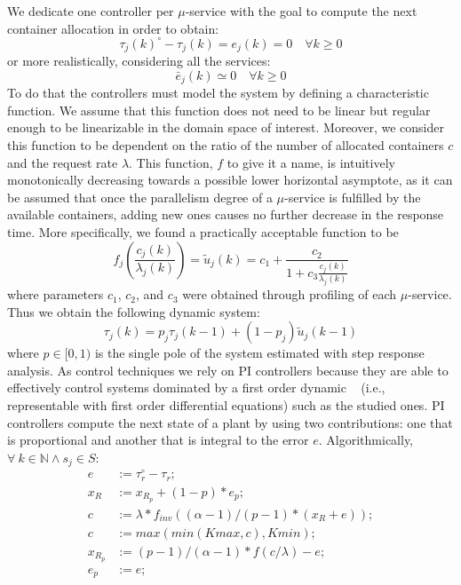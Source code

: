 We dedicate one controller per $\mu$-service with the goal to compute the next container allocation in order to obtain:
{\scriptsize
\begin{equation}
\tau_j(k)^\circ - \tau_j(k) = e_j(k) = 0\quad \forall{k} \ge 0
\end{equation}
}%
or more realistically, considering all the services:
{\scriptsize
\begin{equation}
\bar{e}_j(k) \simeq 0 \quad \forall{k} \ge 0
\end{equation}
}%
To do that the controllers must model the system 
by defining a characteristic function. We assume that this function does not need to be linear but regular enough to be linearizable in the domain space of interest. Moreover, we consider this function to be dependent on the ratio of the number of allocated containers $c$ and the request rate $\lambda$. This function, $f$ to give it a name, is intuitively monotonically decreasing towards a possible lower horizontal asymptote, as it can be assumed that once the parallelism degree of a $\mu$-service is fulfilled by the available containers, adding new ones causes no further decrease in the response time. More specifically, we found a practically acceptable function to be
{\scriptsize
\begin{equation}
f_j \left( \frac{c_j(k)}{\lambda_j(k)}\right)  = \widetilde{u}_j(k) = c_1+\frac{c_2}{1+c_3\frac{c_j(k)}{\lambda_j(k)}}
\label{eqn:CsysModel-f}
\end{equation}
}%
\noindent where parameters $c_1$, $c_2$, and $c_3$ were obtained through profiling of each $\mu$-service. Thus we obtain the following dynamic system:
{\scriptsize
\begin{equation}
\tau_j(k)  = p_j \tau_j(k-1) + (1-p_j)\widetilde{u}_j(k-1)
\label{eqn:CsysModel-s}
\end{equation}
}%
where $p \in [0,1)$ is the single pole of the system estimated with step response analysis. As control techniques we rely on PI controllers because they are able to effectively control systems dominated by a first order dynamic ~\cite{aastrom1995pid} (i.e., representable with first order differential equations) such as the studied ones. PI controllers compute the next state of a plant by using two contributions: one that is proportional and another that is integral to the error $e$. Algorithmically, $\forall\ k \in \mathbb{N} \wedge  s_j \in S$: 
{\scriptsize
\begin{align*}
e   &:= \tau_r^{\circ}-\tau_r;\\
x_R &:= x_{R_p}+(1-p)*e_p;\\
c   &:= \lambda*f_{inv}((\alpha-1)/(p-1)*(x_R+e));\\
c   &:= max(min(Kmax,c), Kmin);\\
x_{R_p} &:= (p-1)/(\alpha-1)*f(c/\lambda)-e;\\
e_p  &:= e;
\end{align*}
}%
